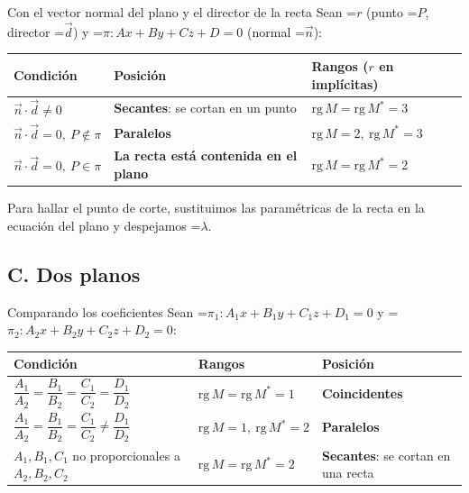 \documentclass[11pt,a4paper]{article}
\newcommand{\fmm}[1]{\setbox0=\hbox{$#1$}\ifdim\wd0>\linewidth\fmdisp{#1}\else\mbox{\box0}\fi}
\newcommand{\fmdisp}[1]{\[\setbox2=\hbox{$\displaystyle #1$}\ifdim\wd2>\linewidth\resizebox{\linewidth}{!}{\box2}\else\box2\fi\]}
\begin{document}
\begin{fmprop}{Con el vector normal del plano y el director de la recta}
Sean \fmm{r} (punto \fmm{P}, director \fmm{\vec d}) y \fmm{\pi:Ax+By+Cz+D=0} (normal \fmm{\vec n}):

\begin{center}\renewcommand{\arraystretch}{2.5}\small\begin{tabularx}{\linewidth}{>{\raggedright\arraybackslash}p{3.2cm}>{\raggedright\arraybackslash}X>{\raggedright\arraybackslash}X}\toprule
\textbf{Condición} & \textbf{Posición} & \textbf{Rangos ($r$ en implícitas)}\\\midrule
$\vec n\cdot\vec d\neq0$ & \textbf{Secantes}: se cortan en un punto & $\mathrm{rg}\,M=\mathrm{rg}\,M^*=3$\\[3pt]
$\vec n\cdot\vec d=0,\ P\notin\pi$ & \textbf{Paralelos} & $\mathrm{rg}\,M=2,\ \mathrm{rg}\,M^*=3$\\[3pt]
$\vec n\cdot\vec d=0,\ P\in\pi$ & \textbf{La recta está contenida en el plano} & $\mathrm{rg}\,M=\mathrm{rg}\,M^*=2$\\[3pt]
\bottomrule\end{tabularx}\end{center}

Para hallar el punto de corte, sustituimos las paramétricas de la recta en la ecuación del plano y despejamos \fmm{\lambda}.
\end{fmprop}

\subsection*{C. Dos planos}

\begin{fmprop}{Comparando los coeficientes}
Sean \fmm{\pi_1:A_1x+B_1y+C_1z+D_1=0} y \fmm{\pi_2:A_2x+B_2y+C_2z+D_2=0}:

\begin{center}\renewcommand{\arraystretch}{2.5}\small\begin{tabularx}{\linewidth}{>{\raggedright\arraybackslash}p{5.2cm}>{\raggedright\arraybackslash}X>{\raggedright\arraybackslash}X}\toprule
\textbf{Condición} & \textbf{Rangos} & \textbf{Posición}\\\midrule
$\dfrac{A_1}{A_2}=\dfrac{B_1}{B_2}=\dfrac{C_1}{C_2}=\dfrac{D_1}{D_2}$ & $\mathrm{rg}\,M=\mathrm{rg}\,M^*=1$ & \textbf{Coincidentes}\\[3pt]
$\dfrac{A_1}{A_2}=\dfrac{B_1}{B_2}=\dfrac{C_1}{C_2}\neq\dfrac{D_1}{D_2}$ & $\mathrm{rg}\,M=1,\ \mathrm{rg}\,M^*=2$ & \textbf{Paralelos}\\[3pt]
$A_1,B_1,C_1$ no proporcionales a $A_2,B_2,C_2$ & $\mathrm{rg}\,M=\mathrm{rg}\,M^*=2$ & \textbf{Secantes}: se cortan en una recta\\[3pt]
\bottomrule\end{tabularx}\end{center}
\end{fmprop}
\end{document}
